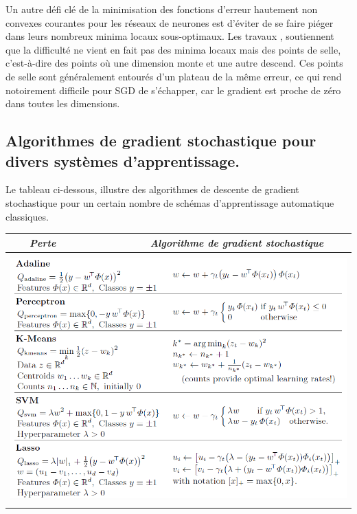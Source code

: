 	
	Un autre défi clé de la minimisation des fonctions d'erreur hautement non convexes courantes pour les réseaux de neurones est d'éviter de se faire piéger dans leurs nombreux minima locaux sous-optimaux. Les travaux \cite{ruder2016overview, bottou2018optimization, bottou2012stochastic}, soutiennent que la difficulté ne vient en fait pas des minima locaux mais des points de selle, c'est-à-dire des points où une dimension monte et une autre descend. Ces points de selle sont généralement entourés d'un plateau de la même erreur, ce qui rend notoirement difficile pour SGD de s'échapper, car le gradient est proche de zéro dans toutes les dimensions.	
	
	
	
	
	
	\subsection*{Algorithmes de gradient stochastique pour divers systèmes d'apprentissage.}
	
	Le tableau ci-dessous, illustre des algorithmes de descente de gradient stochastique pour un certain nombre de schémas d'apprentissage automatique classiques. 
	
	\begin{tabular}{lr}
		\hline
		\textbf{\textsl{$\qquad$Perte}} & \textbf{\textsl{Algorithme de gradient stochastique $\qquad$ }} \\
		\hline
		& \\
		\multicolumn{2}{c}{\includegraphics[width=\textwidth]{images/sg_algo_learning _systems}}\\
		& \\
		\hline
	\end{tabular}
	
